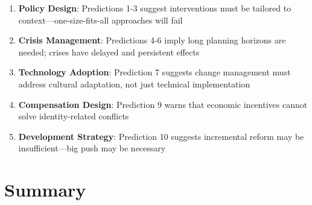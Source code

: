 \begin{tcolorbox}[colback=green!5!white, colframe=green!75!black,
    title=Practical Implications]
\begin{enumerate}
\item \textbf{Policy Design}: Predictions 1-3 suggest interventions must be tailored to context---one-size-fits-all approaches will fail
\item \textbf{Crisis Management}: Predictions 4-6 imply long planning horizons are needed; crises have delayed and persistent effects
\item \textbf{Technology Adoption}: Prediction 7 suggests change management must address cultural adaptation, not just technical implementation
\item \textbf{Compensation Design}: Prediction 9 warns that economic incentives cannot solve identity-related conflicts
\item \textbf{Development Strategy}: Prediction 10 suggests incremental reform may be insufficient---big push may be necessary
\end{enumerate}
\end{tcolorbox}



\section{Summary}
\label{sec:S-summary}

